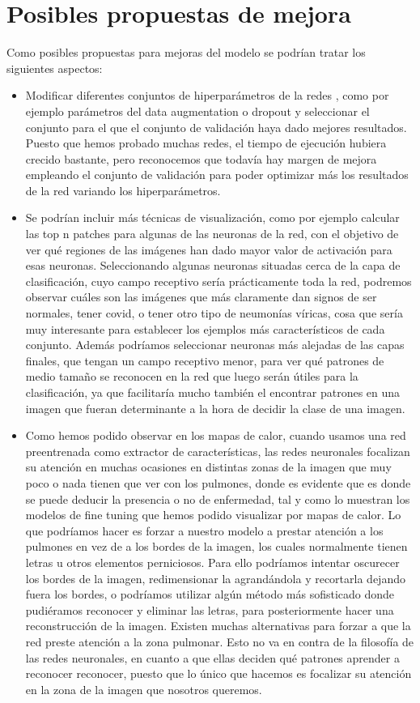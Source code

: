 \documentclass[11pt,a4paper]{article}
\theoremstyle{definition}
\begin{document}
\section{Posibles propuestas de mejora}

Como posibles propuestas para mejoras del modelo se podrían tratar los siguientes aspectos:

\begin{itemize}
\item Modificar diferentes conjuntos de hiperparámetros de la redes , como por ejemplo parámetros del data augmentation o dropout y seleccionar el conjunto para el que el conjunto de validación haya dado mejores resultados.  Puesto que hemos probado muchas redes, el tiempo de ejecución hubiera crecido bastante, pero reconocemos que todavía hay margen de mejora empleando el conjunto de validación para poder optimizar más los resultados de la red variando los hiperparámetros.
\item Se podrían incluir más técnicas de visualización, como por ejemplo calcular las top n patches para algunas de las neuronas de la red, con el objetivo de ver qué regiones de las imágenes han dado mayor valor de activación para esas neuronas. Seleccionando algunas neuronas situadas cerca de la capa de clasificación, cuyo campo receptivo sería prácticamente toda la red, podremos observar cuáles son las imágenes que más claramente dan signos de ser normales, tener covid, o tener otro tipo de neumonías víricas, cosa que sería muy interesante para establecer los ejemplos más característicos de cada conjunto. Además podríamos seleccionar neuronas más alejadas de las capas finales, que tengan un campo receptivo menor, para ver qué patrones de medio tamaño se reconocen en la red que luego serán útiles para la clasificación, ya que facilitaría mucho también el encontrar patrones en una imagen que fueran determinante a la hora de decidir la clase de una imagen.
\item Como hemos podido observar en los mapas de calor, cuando usamos una red preentrenada como extractor de características,  las redes neuronales focalizan su atención en muchas ocasiones en distintas zonas de la imagen que muy poco o nada tienen que ver con los pulmones, donde es evidente que es donde se puede deducir la presencia o no de enfermedad,  tal y como lo muestran los modelos de fine tuning que hemos podido visualizar por mapas de calor.  Lo que podríamos hacer es forzar a nuestro modelo a prestar atención a los pulmones en vez de a los bordes de la imagen, los cuales normalmente tienen letras u otros elementos perniciosos. Para ello podríamos intentar oscurecer los bordes de la imagen,  redimensionar la agrandándola y recortarla dejando fuera los bordes, o podríamos utilizar algún método más sofisticado donde pudiéramos reconocer y eliminar las letras, para posteriormente hacer una reconstrucción de la imagen.  Existen muchas alternativas para forzar a que la red preste atención a la zona pulmonar. Esto no va en contra de la filosofía de las redes neuronales, en cuanto a que ellas deciden qué patrones aprender a reconocer reconocer, puesto que lo único que hacemos es focalizar su atención en la zona de la imagen que nosotros queremos.
\end{itemize}
\end{document}
